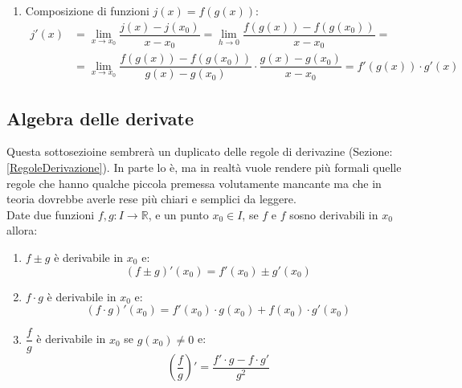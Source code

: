 \begin{enumerate}
	\item Composizione di funzioni $j(x) = f(g(x))$:
		\begin{align*}
			j'(x) &= \lim_{x \to x_0} \dfrac{j(x) - j(x_0)}{x - x_0} = \lim_{h \to 0} \dfrac{f(g(x)) - f(g(x_0))}{x - x_0} =\\[10pt]
			&= \lim_{x \to x_0} \dfrac{f(g(x)) - f(g(x_0))}{g(x) - g(x_0)} \cdot \dfrac{g(x) - g(x_0)}{x - x_0}= f'(g(x)) \cdot g'(x) %
		\end{align*}
\end{enumerate}

\subsection{Algebra delle derivate} 
Questa sottosezioine sembrerà un duplicato delle regole di derivazine (Sezione: \ref{RegoleDerivazione}). In parte lo è, ma in realtà vuole rendere più formali quelle regole che hanno qualche piccola premessa volutamente mancante ma che in teoria dovrebbe averle rese più chiari e semplici da leggere.\\

Date due funzioni $f, g: I \to \mathbb{R}$, e un punto $x_0 \in I$, se $f$ e $f$ sosno derivabili in $x_0$ allora:
\begin{enumerate}
	\item $f \pm g$ è derivabile in $x_0$ e: 
		\begin{equation*}
			(f \pm g)' (x_0) = f'(x_0) \pm g'(x_0)
		\end{equation*}

	\item $f \cdot g$ è derivabile in $x_0$ e: 
		\begin{equation*}
			(f \cdot g)' (x_0) = f'(x_0) \cdot g(x_0) + f(x_0) \cdot g'(x_0)
		\end{equation*}

	\item $\dfrac{f}{g}$ è derivabile in $x_0$ se $g(x_0) \neq 0$ e: 
		\begin{equation*}
			\left( \dfrac{f}{g} \right)' = \dfrac{f' \cdot g - f \cdot g'}{g^2}
		\end{equation*}
\end{enumerate}

